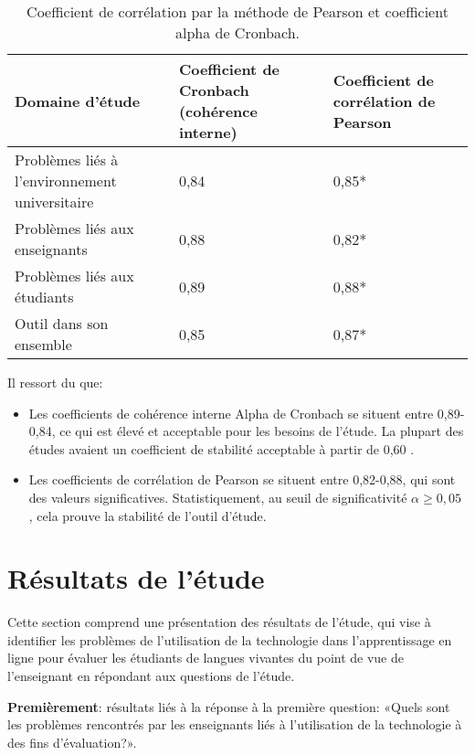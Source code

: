 \documentclass[french]{textolivre}
\begin{document}
\begin{table}[h!]
\centering
\begin{threeparttable}
\caption{Coefficient de corrélation par la méthode de Pearson et coefficient alpha de Cronbach.}
\label{tab2}
\begin{tabular}{p{4cm}ll}
\toprule
Domaine d’étude & \multicolumn{1}{p{4cm}}{Coefficient de Cronbach (cohérence interne)} & \multicolumn{1}{p{4cm}}{Coefficient de corrélation de Pearson} \\
\midrule
Problèmes liés à l'environnement universitaire & 0,84 & 0,85* \\
Problèmes liés aux enseignants & 0,88 & 0,82* \\
Problèmes liés aux étudiants & 0,89 & 0,88* \\
Outil dans son ensemble & 0,85 & 0,87* \\
\bottomrule
\end{tabular}%
\end{threeparttable}
\end{table}

Il ressort du  que: 
\begin{itemize}
\item Les coefficients de cohérence interne Alpha de Cronbach se situent entre 0,89-0,84, ce qui est élevé et acceptable pour les besoins de l’étude. La plupart des études avaient un coefficient de stabilité acceptable à partir de 0,60 \cite{alkilani2012}.
\item Les coefficients de corrélation de Pearson se situent entre 0,82-0,88, qui sont des valeurs significatives. Statistiquement, au seuil de significativité \(\alpha \geq 0,05\) , cela prouve la stabilité de l'outil d'étude.
\end{itemize}
 

\section{Résultats de l'étude}
Cette section comprend une présentation des résultats de l'étude, qui vise à identifier les problèmes de l'utilisation de la technologie dans l'apprentissage en ligne pour évaluer les étudiants de langues vivantes du point de vue de l'enseignant en répondant aux questions de l'étude.

\textbf{Premièrement}: résultats liés à la réponse à la première question: «Quels sont les problèmes rencontrés par les enseignants liés à l'utilisation de la technologie à des fins d'évaluation?».
\end{document}
